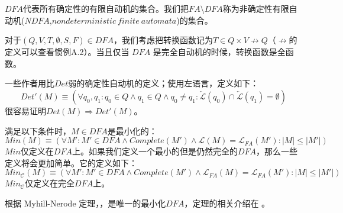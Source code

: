 \begin{definition}[$FA$的确定性]
    $DFA$代表所有确定性的有限自动机的集合。我们把$FA \setminus DFA$称为非确定性有限自动机($NDFA$,$nondeterministic\ finite\ automata$)的集合。
\end{definition}

\begin{convention}[DFA的转换函数]
    对于$(Q,V,T,\emptyset,S,F)\in DFA$，我们考虑把转换函数记为$T\in Q \times V \not\rightarrow Q$（$\not\rightarrow$的定义可以查看惯例A.2）。当且仅当 $DFA$ 是完全自动机的时候，转换函数是全函数。
\end{convention}


\begin{property}[弱确定性自动机]
    一些作者用比$Det$弱的确定性自动机的定义；使用左语言，定义如下：
    $$ Det'(M) \equiv (\forall q_0,q_1 : q_0 \in Q \land q_1 \in Q \land q_0 \not= q_1 : \overleftarrow{\mathcal{L}}(q_0) \cap \overleftarrow{\mathcal{L}}(q_1) = \emptyset ) $$
很容易证明$Det(M) \Rightarrow Det'(M)$。
\end{property}

\begin{definition}
    满足以下条件时，$M\in DFA$是最小化的：
    $$ Min(M) \equiv (\forall M' : M' \in DFA \land Complete(M') \land \mathcal{L}(M) = \mathcal{L}_{FA}(M') : |M| \leq |M'| ) $$
$Min$仅定义在$DFA$上。如果我们定义一个最小的但是仍然完全的$DFA$，那么一些定义将会更加简单。它的定义如下：
\small{ $$ Min_{\mathcal{C}}(M) \equiv ( \forall M':M' \in DFA \land Complete(M') \land \mathcal{L}_{FA}(M) = \mathcal{L}_{FA}(M'): |M| \leq |M'| ) $$ }
$Min_{\mathcal{C}}$仅定义在完全$DFA$上。
\end{definition}

\begin{definition}
    根据 Myhill-Nerode 定理，，是唯一的最小化$DFA$，定理的相关介绍在 \cite{Wats93}。
\end{definition}

